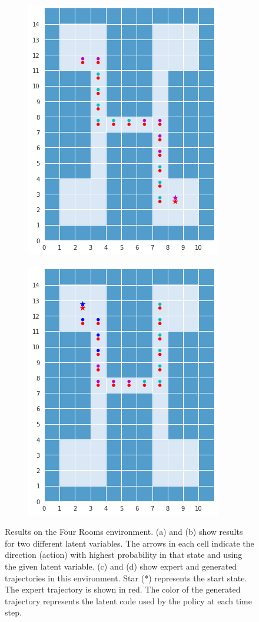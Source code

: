 \documentclass{article} %
\begin{document}
\begin{figure}[t]
    \begin{subfigure}{0.24\columnwidth}
    \centering
    \includegraphics[scale=0.2]{figures/path2.png}
    \caption{}
    \end{subfigure}%
    \begin{subfigure}{0.24\columnwidth}
    \centering
    \includegraphics[scale=0.2]{figures/path4.png}
    \caption{}
    \end{subfigure}%
    
\caption{Results on the Four Rooms environment. (a) and (b) show results for two different latent variables. The arrows in each cell indicate the direction (action) with highest probability in that state and using the given latent variable. (c) and (d) show expert and generated trajectories in this environment. Star (*) represents the start state. The expert trajectory is shown in red. The color of the generated trajectory represents the latent code used by the policy at each time step.}
\label{results_exp1}
\vspace{-0.3cm}
\end{figure}
\end{document}
